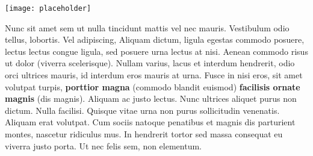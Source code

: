\documentclass[a0paper,portrait]{baposter}
\begin{document}
\begin{poster}
{%

\begin{center}
\texttt{[image: placeholder]}
\end{center}


Nunc sit amet sem ut nulla tincidunt mattis vel nec mauris. Vestibulum odio tellus, lobortis. Vel adipiscing, Aliquam dictum, ligula egestas commodo posuere, lectus lectus congue ligula, sed posuere urna lectus at nisi. Aenean commodo risus ut dolor (viverra scelerisque). Nullam varius, lacus et interdum hendrerit, odio orci ultrices mauris, id interdum eros mauris at urna. Fusce in nisi eros, sit amet volutpat turpis, \textbf{porttior magna} (commodo blandit euismod) \textbf{facilisis ornate magnis} (dis magnis). Aliquam ac justo lectus. Nunc ultrices aliquet purus non dictum. Nulla facilisi. Quisque vitae urna non purus sollicitudin venenatis. Aliquam erat volutpat. Cum sociis natoque penatibus et magnis dis parturient montes, nascetur ridiculus mus. In hendrerit tortor sed massa consequat eu viverra justo porta. Ut nec felis sem, non elementum.
}


\end{poster}
\end{document}
